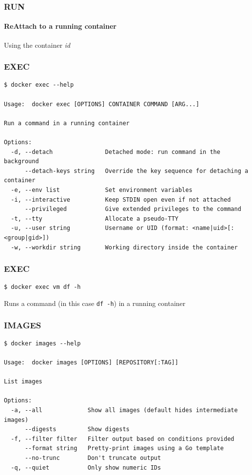 \begin{frame}[fragile]
\frametitle{RUN}
\framesubtitle{ReAttach to a running container}
Using the container \textit{id}
\end{frame}


\begin{frame}[fragile]
\frametitle{EXEC}
\scriptsize
\begin{lstlisting}[breaklines=true]
$ docker exec --help

Usage:  docker exec [OPTIONS] CONTAINER COMMAND [ARG...]

Run a command in a running container

Options:
  -d, --detach               Detached mode: run command in the background
      --detach-keys string   Override the key sequence for detaching a container
  -e, --env list             Set environment variables
  -i, --interactive          Keep STDIN open even if not attached
      --privileged           Give extended privileges to the command
  -t, --tty                  Allocate a pseudo-TTY
  -u, --user string          Username or UID (format: <name|uid>[:<group|gid>])
  -w, --workdir string       Working directory inside the container
\end{lstlisting}
\normalsize
\end{frame}

\begin{frame}[fragile]
\frametitle{EXEC}
\begin{lstlisting}
$ docker exec vm df -h
\end{lstlisting}

Runs a command (in this case \lstinline!df -h!) in a running container
\end{frame}

\begin{frame}[fragile]
\frametitle{IMAGES}
\scriptsize
\begin{lstlisting}[breaklines=true]
$ docker images --help

Usage:  docker images [OPTIONS] [REPOSITORY[:TAG]]

List images

Options:
  -a, --all             Show all images (default hides intermediate images)
      --digests         Show digests
  -f, --filter filter   Filter output based on conditions provided
      --format string   Pretty-print images using a Go template
      --no-trunc        Don't truncate output
  -q, --quiet           Only show numeric IDs
\end{lstlisting}
\normalsize
\end{frame}



